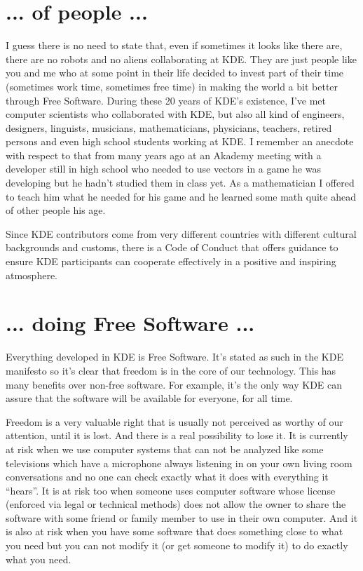\section*{... of people ...}
I guess there is no need to state that, even if sometimes it looks like there are, there are no robots and no aliens collaborating at KDE. They are just people like you and me who at some point in their life decided to invest part of their time (sometimes work time, sometimes free time) in making the world a bit better through Free Software. During these 20 years of KDE's existence, I've met computer scientists who collaborated with KDE, but also all kind of engineers, designers, linguists, musicians, mathematicians, physicians, teachers, retired persons and even high school students working at KDE. I remember an anecdote with respect to that from many years ago at an Akademy meeting with a developer still in high school who needed to use vectors in a game he was developing but he hadn't studied them in class yet. As a mathematician I offered to teach him what he needed for his game and he learned some math quite ahead of other people his age.

Since KDE contributors come from very different countries with different cultural backgrounds and customs, there is a Code of Conduct that offers guidance to ensure KDE participants can cooperate effectively in a positive and inspiring atmosphere.

\section*{... doing Free Software ...}
Everything developed in KDE is Free Software. It's stated as such in the KDE manifesto so it's clear that freedom is in the core of our technology. This has many benefits over non-free software. For example, it's the only way KDE can assure that the software will be available for everyone, for all time.

Freedom is a very valuable right that is usually not perceived as worthy of our attention, until it is lost. And there is a real possibility to lose it. It is currently at risk when we use computer systems that can not be analyzed like some televisions which have a microphone always listening in on your own living room conversations and no one can check exactly what it does with everything it “hears”. It is at risk too when someone uses computer software whose license (enforced via legal or technical methods) does not allow the owner to share the software with some friend or family member to use in their own computer. And it is also at risk when you have some software that does something close to what you need but you can not modify it (or get someone to modify it) to do exactly what you need.

